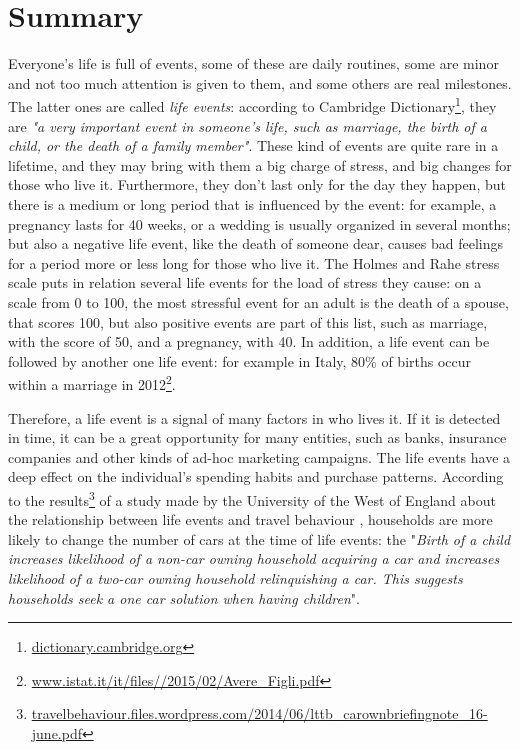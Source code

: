 \chapter*{Summary} %
\label{summary}
Everyone's life is full of events, some of these are daily routines, some are minor and not too much attention is given to them, and some others are real milestones. The latter ones are called \emph{life events}: according to Cambridge Dictionary\footnote{\url{dictionary.cambridge.org}}, they are \textit{"a very important event in someone's life, such as marriage, the birth of a child, or the death of a family member"}. These kind of events are quite rare in a lifetime, and they may bring with them a big charge of stress, and big changes for those who live it. Furthermore, they don't last only for the day they happen, but there is a medium or long period that is influenced by the event: for example, a pregnancy lasts for 40 weeks, or a wedding is usually organized in several months; but also a negative life event, like the death of someone dear, causes bad feelings for a period more or less long for those who live it. The Holmes and Rahe stress scale \cite{holmes1967social} puts in relation several life events for the load of stress they cause: on a scale from 0 to 100, the most stressful event for an adult is the death of a spouse, that scores 100, but also positive events are part of this list, such as marriage, with the score of 50, and a pregnancy, with 40. In addition, a life event can be followed by another one life event: for example in Italy, 80\% of births occur within a marriage in 2012\footnote{\url{www.istat.it/it/files//2015/02/Avere_Figli.pdf}}.

Therefore, a life event is a signal of many factors in who lives it. If it is detected in time, it can be a great opportunity for many entities, such as banks, insurance companies and other kinds of ad-hoc marketing campaigns. The life events have a deep effect on the individual's spending habits and purchase patterns. According to the results\footnote{\url{travelbehaviour.files.wordpress.com/2014/06/lttb_carownbriefingnote_16-june.pdf}} of a study made by the University of the West of England about the relationship between life events and travel behaviour \cite{chatterjee2015facts}, households are more likely to change the number of cars at the time of life events: the "\textit{Birth of a child increases likelihood of a non-car owning household acquiring a car and increases likelihood of a two-car owning household relinquishing a car. This suggests households seek a one car solution when having children}".


